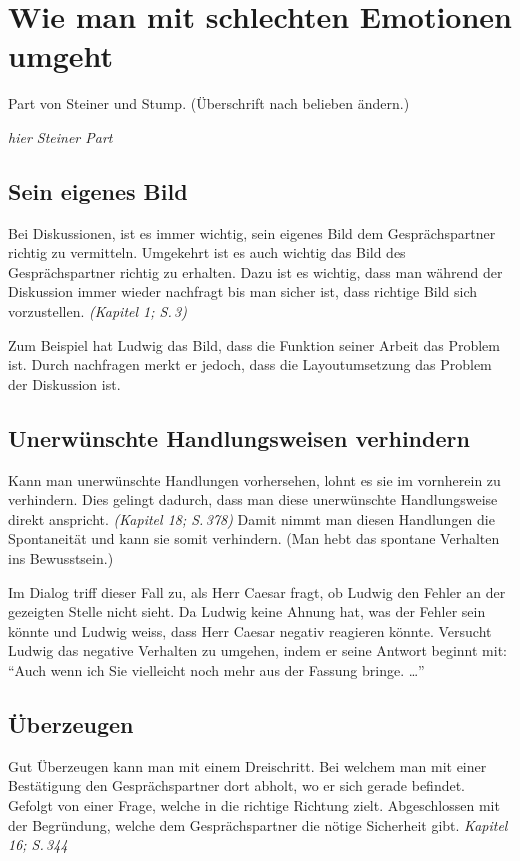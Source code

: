 \section*{Wie man mit schlechten Emotionen umgeht}

Part von Steiner und Stump. (Überschrift nach belieben ändern.)

\emph{hier Steiner Part}

\subsection*{Sein eigenes Bild}
Bei Diskussionen, ist es immer wichtig, sein eigenes Bild dem
Gesprächspartner richtig zu vermitteln.  Umgekehrt ist es auch wichtig
das Bild des Gesprächspartner richtig zu erhalten.  Dazu ist es
wichtig, dass man während der Diskussion immer wieder nachfragt bis
man sicher ist, dass richtige Bild sich vorzustellen. \textit{(Kapitel
1; S.\,3)}

Zum Beispiel hat Ludwig das Bild, dass die Funktion seiner
Arbeit das Problem ist. Durch nachfragen merkt er jedoch, dass die
Layoutumsetzung das Problem der Diskussion ist.

\subsection*{Unerwünschte Handlungsweisen verhindern}
Kann man unerwünschte Handlungen vorhersehen, lohnt es sie im
vornherein zu verhindern.  Dies gelingt dadurch, dass man diese
unerwünschte Handlungsweise direkt anspricht. \textit{(Kapitel 18;
  S.\,378)} Damit nimmt man diesen Handlungen die Spontaneität und
kann sie somit verhindern.  (Man hebt das spontane Verhalten ins
Bewusstsein.)

Im Dialog triff dieser Fall zu, als Herr Caesar fragt, ob Ludwig den
Fehler an der gezeigten Stelle nicht sieht.  Da Ludwig keine Ahnung
hat, was der Fehler sein könnte und Ludwig weiss, dass Herr Caesar
negativ reagieren könnte.  Versucht Ludwig das negative Verhalten zu
umgehen, indem er seine Antwort beginnt mit:  "`Auch wenn ich Sie
vielleicht noch mehr aus der Fassung bringe. \dots"'

\subsection*{Überzeugen}
Gut Überzeugen kann man mit einem Dreischritt.  Bei welchem man mit
einer Bestätigung den Gesprächspartner dort abholt, wo er sich gerade
befindet.  Gefolgt von einer Frage, welche in die richtige Richtung
zielt.  Abgeschlossen mit der Begründung, welche dem Gesprächspartner
die nötige Sicherheit gibt. \emph{Kapitel 16; S.\,344}

